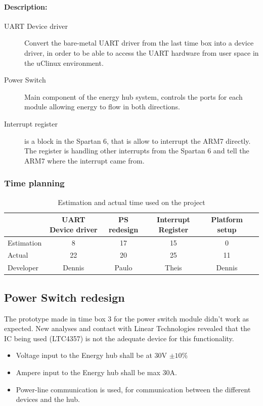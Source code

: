 \paragraph{Description:}
\begin{description}
	\item[UART Device driver] Convert the bare-metal UART driver from the last time box into a device driver, in order to be able to access the UART hardware from user space in the uClinux environment.
	\item[Power Switch] Main component of the energy hub system, controls the ports for each module allowing energy to flow in both directions.
	\item[Interrupt register] is a block in the Spartan 6, that is allow to interrupt the ARM7 directly. The register is handling other interrupts from the Spartan 6 and tell the ARM7 where the interrupt came from.
\end{description}
\subsubsection{Time planning}
\begin{table}[H]
\centering
	\begin{tabular}{|l|c|c|c|c|c|}
		\hline
		~			& UART Device driver	& PS redesign		& Interrupt Register	& Platform setup\\ \hline
		Estimation	& 8						& 17				& 15				& 0			  \\
		Actual		& 22					& 20				& 25				& 11		  \\
		Developer	& Dennis				& Paulo				& Theis				& Dennis	  \\
		\hline
	\end{tabular}
	\caption{Estimation and actual time used on the project}
\end{table}

\subsection{Power Switch redesign}
The prototype made in time box 3 for the power switch module didn't work as expected. New analyses and contact with Linear Technologies revealed that the IC being used (LTC4357) is not the adequate device for this functionality.

\begin{itemize}
	\item Voltage input to the Energy hub shall be at 30V $ \pm10\% $
	\item Ampere input to the Energy hub shall be max 30A.
	\item Power-line communication is used, for communication between the different devices and the hub.
\end{itemize}

